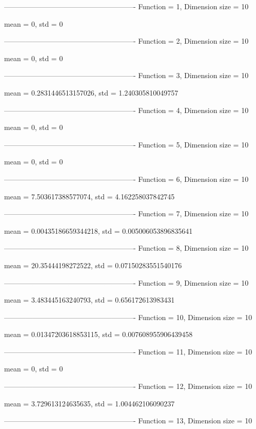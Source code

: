 -------------------------------------------------------
Function = 1, Dimension size = 10


mean = 0, std = 0

-------------------------------------------------------
Function = 2, Dimension size = 10


mean = 0, std = 0

-------------------------------------------------------
Function = 3, Dimension size = 10


mean = 0.2831446513157026, std = 1.240305810049757

-------------------------------------------------------
Function = 4, Dimension size = 10


mean = 0, std = 0

-------------------------------------------------------
Function = 5, Dimension size = 10


mean = 0, std = 0

-------------------------------------------------------
Function = 6, Dimension size = 10


mean = 7.503617388577074, std = 4.162258037842745

-------------------------------------------------------
Function = 7, Dimension size = 10


mean = 0.00435186659344218, std = 0.005006053896835641

-------------------------------------------------------
Function = 8, Dimension size = 10


mean = 20.35444198272522, std = 0.07150283551540176

-------------------------------------------------------
Function = 9, Dimension size = 10


mean = 3.483445163240793, std = 0.656172613983431

-------------------------------------------------------
Function = 10, Dimension size = 10


mean = 0.01347203618853115, std = 0.007608955906439458

-------------------------------------------------------
Function = 11, Dimension size = 10


mean = 0, std = 0

-------------------------------------------------------
Function = 12, Dimension size = 10


mean = 3.729613124635635, std = 1.004462106090237

-------------------------------------------------------
Function = 13, Dimension size = 10


